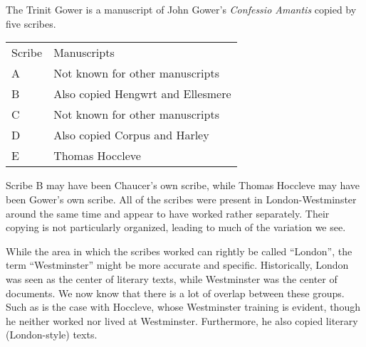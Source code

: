 \documentclass[12pt]{report}
\begin{document}
\chapter{}

The Trinit Gower is a manuscript of John Gower's \textit{Confessio Amantis}
copied by five scribes.

\begin{tabular}{l|l}
	Scribe & Manuscripts\\
	A & Not known for other manuscripts\\
	B & Also copied Hengwrt and Ellesmere\\
	C & Not known for other manuscripts\\
	D & Also copied Corpus and Harley\\
	E & Thomas Hoccleve\\
\end{tabular}

Scribe B may have been Chaucer's own scribe, while Thomas Hoccleve may have been
Gower's own scribe.  All of the scribes were present in London-Westminster
around the same time and appear to have worked rather separately. Their copying
is not particularly organized, leading to much of the variation we see.

While the area in which the scribes worked can rightly be called ``London'', the
term ``Westminster'' might be more accurate and specific. Historically, London
was seen as the center of literary texts, while Westminster was the center of
documents. We now know that there is a lot of overlap between these groups. Such
as is the case with Hoccleve, whose Westminster training is evident, though he
neither worked nor lived at Westminster. Furthermore, he also copied literary
(London-style) texts.
\end{document}
